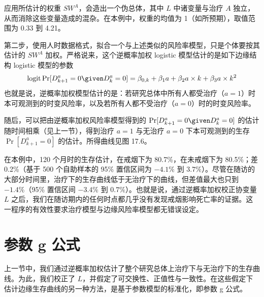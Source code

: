 应用所估计的权重 $SW^A$，会造出一个伪总体，其中 $L$ 中诸变量与治疗 $A$ 独立，从而消除这些变量造成的混杂。在本例中，权重的均值为 1（如所预期），取值范围为 0.33 到 4.21。

第二步，使用人时数据格式，拟合一个与上述类似的风险率模型，只是个体要按其估计的 $SW^A$ 加权。严格说来，这个逆概率加权 logistic 模型估计的是如下边缘结构 logistic 模型的参数
\[
\operatorname{logit}\Pr[D_{k+1}^a=0\given D_k^a=0]=\beta_{0,k}+\beta_1a+\beta_2a\times k+\beta_3a\times k^2
\]
也就是说，逆概率加权模型估计的是：若研究总体中所有人都受治疗（$a=1$）时本可观测到的时变风险率，以及若所有人都不受治疗（$a=0$）时的时变风险率。

随后，可以把由逆概率加权风险率模型得到的 $\Pr[D_{k+1}^a=0\given D_k^a=0]$ 的估计随时间相乘（见上一节），得到治疗 $a=1$ 与无治疗 $a=0$ 下本可观测到的生存 $\Pr[D_{k+1}^a=0]$ 的估计。所得曲线见图 17.6。

\begin{figure}[htbp]
\centering
{}
\caption{}
\label{fig:17.6}
\end{figure}

在本例中，120 个月时的生存估计，在戒烟下为 80.7\%，在未戒烟下为 80.5\%；差 0.2\%（基于 500 个自助样本的 95\% 置信区间为 $-4.1\%$ 到 $3.7\%$）。尽管在随访的大部分时间里，治疗下的生存曲线低于无治疗下的曲线，但差值最大也只到 $-1.4\%$（95\% 置信区间 $-3.4\%$ 到 $0.7\%$）。也就是说，通过逆概率加权校正协变量 $L$ 之后，我们在随访期内的任何时点都几乎没有发现戒烟影响死亡率的证据。这一程序的有效性要求治疗模型与边缘风险率模型都无错误设定。

\section{参数 g 公式}

上一节中，我们通过逆概率加权估计了整个研究总体上治疗下与无治疗下的生存曲线。为此，我们校正了 $L$，并假定了可交换性、正值性与一致性。在这些假定下估计边缘生存曲线的另一种方法，是基于参数模型的标准化，即参数 g 公式。

